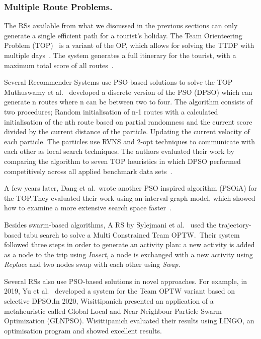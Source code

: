 \subsubsection{Multiple Route Problems.}

The RSs available from what we discussed in the previous sections can only
generate a single efficient path for a tourist's holiday. The Team Orienteering
Problem (TOP)~\cite{Chao1996} is a variant of the OP, which allows for
solving the TTDP with multiple days~\cite{Sylejmani2017}. The system generates a full
itinerary for the tourist, with a maximum total score of all routes~\cite{Herzog2020}.

Several Recommender Systems use PSO-based solutions to solve the TOP
~\cite{Muthuswamy2011,Wisittipanich2020,Yu2019}
Muthuswamy et al.~\cite{Muthuswamy2011} developed a discrete version of the PSO (DPSO)
which can generate n routes
where n can be between two to four. The algorithm consists of two procedures;
Random initialisation of n-1 routes with a calculated initialisation of the nth
route based on partial randomness and the current score divided by the current
distance of the particle.  Updating the current velocity of each particle.  The
particles use RVNS and 2-opt techniques to communicate with each other as local
search techniques. The authors evaluated their work by comparing the algorithm
to seven TOP heuristics in which DPSO performed competitively across all
applied benchmark data sets~\cite{Gavalas2014a}.

A few years later, Dang et al.\ wrote another PSO inspired algorithm (PSOiA) for
the TOP.\@ They evaluated their work using an interval graph model, which showed
how to examine a more extensive search space faster~\cite{Gunawan2016}.

Besides swarm-based algorithms, A RS by Sylejmani et al.~\cite{Sylejmani2012}
used the trajectory-based tabu search to solve a Multi Constrained Team OPTW.\
Their system followed three steps in order to generate an activity plan: a new
activity is added as a node to the trip using \emph{Insert}, a node is
exchanged with a new activity using \emph{Replace} and two nodes swap with each
other using \emph{Swap}. 

Several RSs also use PSO-based solutions in novel approaches. For example, in
2019, Yu et al.~\cite{Yu2019} developed a system for the Team OPTW variant based on
selective DPSO.\@ In 2020, Wisittipanich\cite{Wisittipanich2020} presented an application of a
metaheuristic called Global Local and Near-Neighbour Particle Swarm
Optimization (GLNPSO). Wisittipanich evaluated their results using LINGO, an
optimisation program and showed excellent results.

